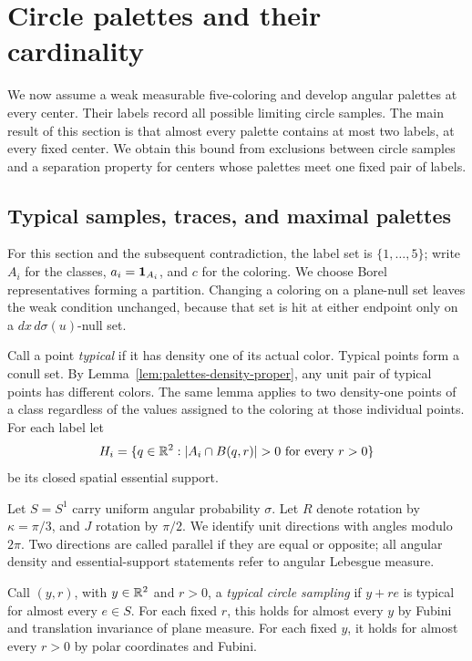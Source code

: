 \section{Circle palettes and their cardinality}\label{sec:palettes}

We now assume a weak measurable five-coloring and develop angular
palettes at every center.  Their labels record all possible limiting
circle samples.  The main result of this section is that almost every
palette contains at most two labels, at every fixed center.  We obtain
this bound from exclusions between circle samples and a separation
property for centers whose palettes meet one fixed pair of labels.

\subsection{Typical samples, traces, and maximal palettes}

For this section and the subsequent contradiction, the label set is
\(\{1,\ldots,5\}\); write \(A_i\) for the classes,
\(a_i=\mathbf 1_{A_i}\), and \(c\) for the coloring.
We choose Borel representatives forming a partition.
Changing a coloring on a plane-null set leaves the weak condition
unchanged, because that set is hit at either endpoint only on a
\(dx\,d\sigma(u)\)-null set.

Call a point \emph{typical} if it has density one of its actual color.
Typical points form a conull set.  By
Lemma~\ref{lem:palettes-density-proper}, any unit pair of typical
points has different colors.  The same lemma applies to two
density-one points of a class regardless of the values assigned
to the coloring at those individual points.
For each label let
\[
 H_i=\{q\in\mathbb R^2:
       \lvert A_i\cap B(q,r)\rvert>0\text{ for every }r>0\}
\]
be its closed spatial essential support.

Let \(S=S^1\) carry uniform angular probability \(\sigma\).
Let \(R\) denote rotation by \(\kappa=\pi/3\), and \(J\) rotation
by \(\pi/2\).  We identify unit directions with angles modulo
\(2\pi\).  Two directions are called parallel if they are equal
or opposite; all angular density and essential-support statements
refer to angular Lebesgue measure.

Call \((y,r)\), with \(y\in\mathbb R^2\) and \(r>0\), a \emph{typical circle
sampling} if \(y+re\) is typical for almost every \(e\in S\).
For each fixed \(r\), this holds for almost every \(y\) by Fubini
and translation invariance of plane measure.
For each fixed \(y\), it holds for almost every \(r>0\) by polar
coordinates and Fubini.

